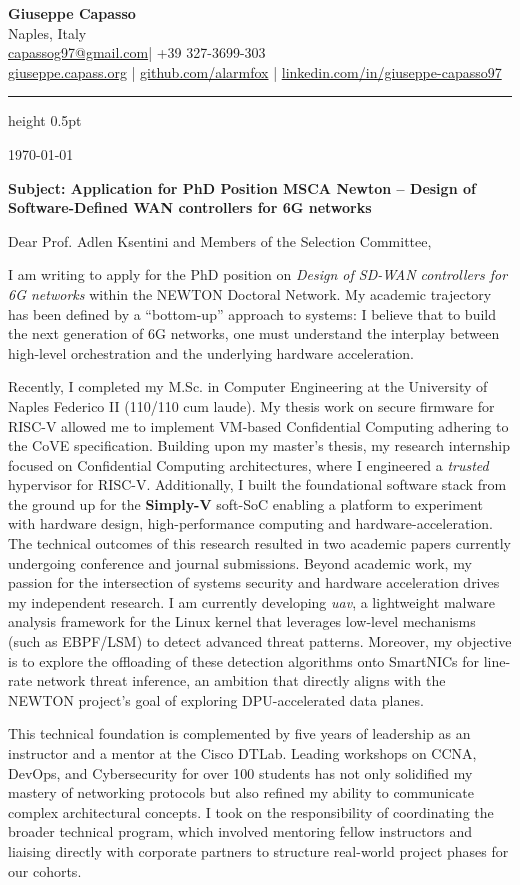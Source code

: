 \documentclass[11pt,a4paper]{article}
\makeatletter
\newcommand{\contactheader}{
    \begin{center}
        {\huge \textbf{Giuseppe Capasso}} \\
        \vspace{2mm}
        \small{
            Naples, Italy \\
            \href{mailto:capassog97@gmail.com}{capassog97@gmail.com}| +39 327-3699-303\\
            \href{https://giuseppe.capass.org}{giuseppe.capass.org} |
            \href{https://github.com/alarmfox}{github.com/alarmfox} |
            \href{https://linkedin.com/in/giuseppe-capasso97}{linkedin.com/in/giuseppe-capasso97}
        }
    \end{center}
    \vspace{2mm}
    \hrule height 0.5pt
    \vspace{8mm}
}
\makeatother
\begin{document}
\pagestyle{empty}

\contactheader
\hfill \today

\textbf{Subject: Application for PhD Position MSCA Newton – Design of Software-Defined WAN controllers for 6G networks}

Dear Prof. Adlen Ksentini and Members of the Selection Committee,

I am writing to apply for the PhD position on \textit{Design of SD-WAN controllers for 6G networks} within the NEWTON Doctoral Network. My academic trajectory has been defined by a ``bottom-up'' approach to systems: I believe that to build the next generation of 6G networks, one must understand the interplay between high-level orchestration and the underlying hardware acceleration.

Recently, I completed my M.Sc. in Computer Engineering at the University of Naples Federico II (110/110 cum laude). My thesis work on secure firmware for RISC-V allowed me to implement VM-based Confidential Computing adhering to the CoVE specification. Building upon my master's thesis, my research internship focused on Confidential Computing architectures, where I engineered a \textit{trusted} hypervisor for RISC-V. Additionally, I built the foundational software stack from the ground up for the \textbf{Simply-V} soft-SoC enabling a platform to experiment with hardware design, high-performance computing and hardware-acceleration.
The technical outcomes of this research resulted in two academic papers currently undergoing conference and journal submissions. Beyond academic work, my passion for the intersection of systems security and hardware acceleration drives my independent research. I am currently developing \textit{uav}, a lightweight malware analysis framework for the Linux kernel that leverages low-level mechanisms (such as EBPF/LSM) to detect advanced threat patterns. Moreover, my objective is to explore the offloading of these detection algorithms onto SmartNICs for line-rate network threat inference, an ambition that directly aligns with the NEWTON project's goal of exploring DPU-accelerated data planes.

This technical foundation is complemented by five years of leadership as an instructor and a mentor at the Cisco DTLab. Leading workshops on CCNA, DevOps, and Cybersecurity for over 100 students has not only solidified my mastery of networking protocols but also refined my ability to communicate complex architectural concepts. I took on the responsibility of coordinating the broader technical program, which involved mentoring fellow instructors and liaising directly with corporate partners to structure real-world project phases for our cohorts.
\end{document}
